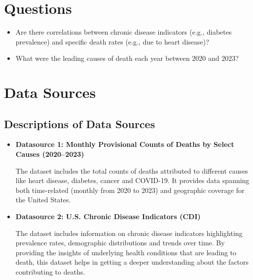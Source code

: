\documentclass[a4paper,10pt]{article}
\begin{document}
	
	\section{Questions}
		\begin{itemize}
			\item Are there correlations between chronic disease indicators (e.g., diabetes prevalence) and specific death rates (e.g., due to heart disease)?
			\item What were the leading causes of death each year between 2020 and 2023?
		\end{itemize}
	
	\section{Data Sources}
	\subsection{Descriptions of Data Sources}
	\begin{itemize}
		\item \textbf{Datasource 1: Monthly Provisional Counts of Deaths by Select Causes (2020--2023)}
		
		The dataset includes the total counts of deaths attributed to different causes like heart disease, diabetes, cancer and COVID-19. It provides data spanning both time-related (monthly from 2020 to 2023) and geographic coverage for the United States. \cite{dataset1}
	
	\end{itemize}

	\begin{itemize}
		\item \textbf{Datasource 2: U.S. Chronic Disease Indicators (CDI)} 
		
		The dataset includes information on chronic disease indicators highlighting prevalence rates, demographic distributions and trends over time. By providing the insights of underlying health conditions that are leading to death, this dataset helps in getting a deeper understanding about the factors contributing to deaths. \cite{dataset2}
		
	\end{itemize}
	
\end{document}
